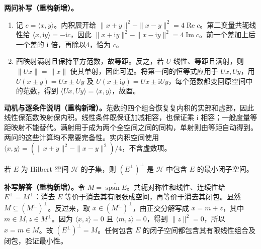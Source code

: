 \documentclass[../../main.tex]{subfiles}
\begin{document}
\begin{solution}
\textbf{两问补写（重构新增）。}
\begin{enumerate}
\item 记 $c=\langle x,y\rangle$。内积展开给 $\|x+y\|^2-\|x-y\|^2=4\operatorname{Re}c$。第二变量共轭线性给 $\langle x,\mathrm iy\rangle=-\mathrm ic$，因此 $\|x+\mathrm iy\|^2-\|x-\mathrm iy\|^2=4\operatorname{Im}c$。前一个差加上后一个差的 $\mathrm i$ 倍，再除以4，恰为 $c$。
\item 酉映射满射且保持平方范数，故等距。反之，若 $U$ 线性、等距且满射，则 $\|Ux\|=\|x\|$ 使其单射，因此可逆。将第一问的恒等式应用于 $Ux,Uy$，用 $U(x\pm y)=Ux\pm Uy$ 及 $U(x\pm\mathrm iy)=Ux\pm\mathrm iUy$，每个范数都变回原空间中的范数，得到 $\langle Ux,Uy\rangle=\langle x,y\rangle$，故酉。
\end{enumerate}
\end{solution}
\begin{remark}
\textbf{动机与逐条件说明（重构新增）。}范数的四个组合恢复复内积的实部和虚部，因此线性保范数映射保内积。线性条件既保证加减相容，也保证乘 $\mathrm i$ 相容；一般度量等距映射不能替代。满射用于成为两个全空间之间的同构，单射则由等距自动得到。两问的这些计算均不需要完备性。实内积空间使用 $\langle x,y\rangle=(\|x+y\|^2-\|x-y\|^2)/4$，不含虚数项。
\end{remark}
\begin{exercise}\label{exercise:ch05-double-orthogonal}
若 $E$ 为 Hilbert 空间 $\mathscr H$ 的子集，则 $(E^\perp)^\perp$ 是 $\mathscr H$ 中包含 $E$ 的最小闭子空间。
\end{exercise}
\begin{solution}
\textbf{补写解答（重构新增）。}令 $M=\overline{\operatorname{span}E}$。共轭对称性和线性、连续性给 $E^\perp=M^\perp$：消去 $E$ 等价于消去其有限张成空间，再等价于消去其闭包。显然 $M\subseteq(M^\perp)^\perp$。反过来，取 $x\in(M^\perp)^\perp$，由正交分解写成 $x=m+z$，其中 $m\in M,z\in M^\perp$。因为 $\langle x,z\rangle=0$ 且 $\langle m,z\rangle=0$，得到 $\|z\|^2=0$，所以 $x=m\in M$。故 $(E^\perp)^\perp=M$。任何包含 $E$ 的闭子空间都包含其有限线性组合及闭包，验证最小性。
\end{solution}
\end{document}
